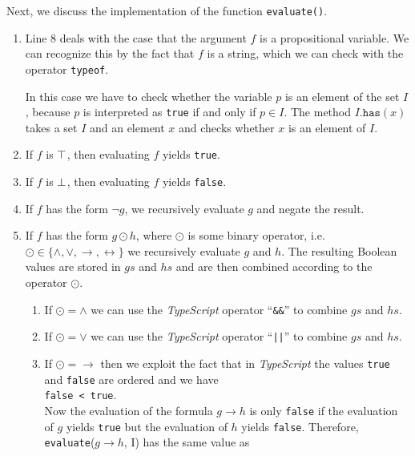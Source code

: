 \noindent
Next, we discuss the implementation of the function \texttt{evaluate()}.
\begin{enumerate}
\item Line 8 deals with the case that the argument $f$ is a propositional variable.  We can recognize this by
      the fact that $f$ is a string, which we can check with the operator
      \texttt{typeof}.

      In this case we have to check whether the variable $p$ is an element of the set $I$, because $p$ is
      interpreted as \texttt{true} if and only if $p \in I$.  The method $I\mathtt{.has}(x)$
      takes a set $I$ and an element $x$ and checks whether $x$ is an element of $I$.
\item If $f$ is $\top$, then evaluating $f$ yields \texttt{true}.
\item If $f$ is $\bot$, then evaluating $f$ yields \texttt{false}. 
\item If $f$ has the form $\neg g$, we recursively evaluate $g$  and negate the result.
\item If $f$ has the form $g \odot h$, where $\odot$ is some binary operator, i.e.~
      $\odot \in \{\wedge, \vee, \rightarrow, \leftrightarrow\}$ we recursively evaluate
      $g$ and $h$.  The resulting Boolean values are stored in $gs$ and $hs$ and are
      then combined according to the operator $\odot$.
      \begin{enumerate}
      \item If $\odot = \wedge$ we can use the \textsl{TypeScript} operator ``\texttt{\&\&}''
            to combine $gs$ and $hs$.
      \item If $\odot = \vee$ we can use the \textsl{TypeScript} operator ``\texttt{||}''
            to combine $gs$ and $hs$.
      \item If $\odot = \rightarrow$ then we exploit the fact that in \textsl{TypeScript} the values \texttt{true} and
            \texttt{false} are ordered and we have
            \\[0.2cm]
            \hspace*{1.3cm}
            \texttt{false < true}.
            \\[0.2cm]
            Now the evaluation of the formula $g \rightarrow h$ is only \texttt{false} if the evaluation of $g$ yields \texttt{true} but the
            evaluation of $h$ yields \texttt{false}.  Therefore, 
            \\[0.2cm]
            \hspace*{1.3cm}
            \texttt{evaluate}($g \rightarrow h$, I) \quad has the same value as \quad

\end{enumerate}
\end{enumerate}
